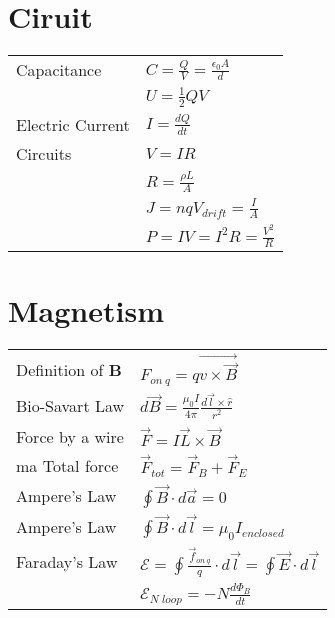 \documentclass[5pt]{article}
\begin{document}
\begin{multicols}{2}
\section{Ciruit}
\begin{tabular}{ll}
Capacitance      & $C=\frac{Q}{V}=\frac{\epsilon_0A}{d}$\\
                 & $U=\frac{1}{2}QV$\\
Electric Current & $I=\frac{dQ}{dt}$\\
Circuits         & $V=IR$\\
                 & $R=\frac{\rho L}{A}$\\
                 & $J=nqV_{drift}=\frac{I}{A}$\\
                 & $P=IV=I^2R=\frac{V^2}{R}$\\
\end{tabular}


\section{Magnetism}
\begin{tabular}{ll}
Definition of \textbf{B} & $F_{on\:q}=q\vec{v\times\vec{B}}$\\
Bio-Savart Law & $d\Vec{B}=\frac{\mu_0I}{4\pi}\frac{d\Vec{l}\times\hat{r}}{r^2}$\\
Force by a wire & $\vec{F}=I\vec{L}\times\vec{B}$\\
ma
Total force & $\vec{F}_{tot}=\vec{F}_{B} + \vec{F}_{E}$\\
Ampere's Law & $\oint\Vec{B}\cdot d\vec{a}=0$\\
Ampere's Law & $\oint\Vec{B}\cdot d\vec{l}=\mu_0I_{enclosed}$\\
Faraday's Law & $\mathcal{E}=\oint \frac{\vec{f}_{on\:q}}{q}\cdot d\vec{l}=\oint \vec{E}\cdot d\vec{l}$\\
              & $\mathcal{E}_{N\;loop}=-N\frac{d\Phi_B}{dt}$\\
              

\end{tabular}






\end{multicols}
\end{document}
